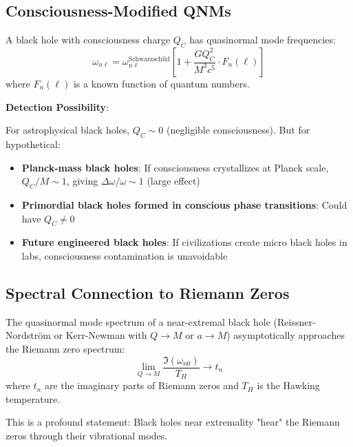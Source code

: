 \subsection{Consciousness-Modified QNMs}

\begin{theorem}\label{thm:consciousness-qnm-shift}
A black hole with consciousness charge $Q_C$ has quasinormal mode frequencies:
\begin{equation}
\boxed{\omega_{n\ell} = \omega_{n\ell}^{\text{Schwarzschild}} \left[ 1 + \frac{G Q_C^2}{M^3 c^5} \cdot F_n(\ell) \right]}
\end{equation}
where $F_n(\ell)$ is a known function of quantum numbers.
\end{theorem}

\textbf{Detection Possibility}:

For astrophysical black holes, $Q_C \sim 0$ (negligible consciousness). But for hypothetical:
\begin{itemize}
\item \textbf{Planck-mass black holes}: If consciousness crystallizes at Planck scale, $Q_C/M \sim 1$, giving $\Delta\omega/\omega \sim 1$ (large effect)
\item \textbf{Primordial black holes formed in conscious phase transitions}: Could have $Q_C \neq 0$
\item \textbf{Future engineered black holes}: If civilizations create micro black holes in labs, consciousness contamination is unavoidable
\end{itemize}

\subsection{Spectral Connection to Riemann Zeros}

\begin{conjecture}\label{conj:qnm-zero}
The quasinormal mode spectrum of a near-extremal black hole (Reissner-Nordström or Kerr-Newman with $Q \to M$ or $a \to M$) asymptotically approaches the Riemann zero spectrum:
\begin{equation}
\lim_{Q \to M} \frac{\Im(\omega_{n0})}{T_H} \to t_n
\end{equation}
where $t_n$ are the imaginary parts of Riemann zeros and $T_H$ is the Hawking temperature.
\end{conjecture}

This is a profound statement: Black holes near extremality "hear" the Riemann zeros through their vibrational modes.

